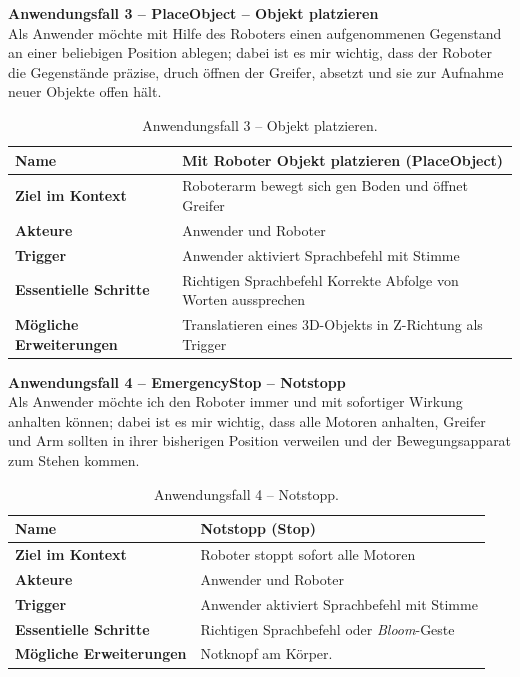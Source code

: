 \textbf{Anwendungsfall 3 -- PlaceObject -- Objekt platzieren}\\
\frqq Als Anwender möchte mit Hilfe des Roboters einen aufgenommenen Gegenstand an einer beliebigen Position ablegen; dabei ist es mir wichtig, dass der Roboter die Gegenstände präzise, druch öffnen der Greifer, absetzt und sie zur Aufnahme neuer Objekte offen hält.\flqq
\begin{table}[H]
	\centering
	\begin{tabular}{|l|p{8cm}|}
		\hline
		\textbf{Name} & Mit Roboter Objekt platzieren (PlaceObject)  \\
		\hline
		\textbf{Ziel im Kontext} & Roboterarm bewegt sich gen Boden und öffnet Greifer \\
		\hline
		\textbf{Akteure} & Anwender und Roboter \\
		\hline
		\textbf{Trigger} & Anwender aktiviert Sprachbefehl mit Stimme \\
		\hline
		\textbf{Essentielle Schritte} & Richtigen Sprachbefehl \newline Korrekte Abfolge von Worten aussprechen \newline \\
		\hline
		\textbf{Mögliche Erweiterungen} & Translatieren eines 3D-Objekts in Z-Richtung als Trigger \\
		\hline
	\end{tabular}
	\caption{Anwendungsfall 3 -- \frqq Objekt platzieren\flqq.}
	\label{tab:usecase3}
\end{table}
\textbf{Anwendungsfall 4 -- EmergencyStop -- Notstopp}\\
\frqq Als Anwender möchte ich den Roboter immer und mit sofortiger Wirkung anhalten können; dabei ist es mir wichtig, dass alle Motoren anhalten, Greifer und Arm sollten in ihrer bisherigen Position verweilen und der Bewegungsapparat zum Stehen kommen.\flqq
\begin{table}[H]
	\centering
	\begin{tabular}{|l|p{8cm}|}
		\hline
		\textbf{Name} & Notstopp (Stop)  \\
		\hline
		\textbf{Ziel im Kontext} & Roboter stoppt sofort alle Motoren \\
		\hline
		\textbf{Akteure} & Anwender und Roboter \\
		\hline
		\textbf{Trigger} & Anwender aktiviert Sprachbefehl mit Stimme \\
		\hline
		\textbf{Essentielle Schritte} & Richtigen Sprachbefehl oder \textit{Bloom}-Geste\\
		\hline
		\textbf{Mögliche Erweiterungen} & Notknopf am Körper. \\
		\hline
	\end{tabular}
	\caption{Anwendungsfall 4 -- \frqq Notstopp\flqq.}
	\label{tab:usecase4}
\end{table}
